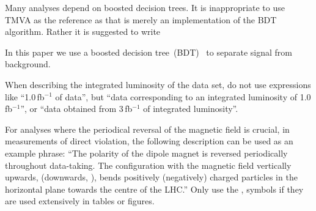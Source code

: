 Many analyses depend on boosted decision trees. It is inappropriate to
use TMVA as the reference as that is merely an implementation of the
BDT algorithm. Rather it is suggested to write

In this paper we use a boosted decision tree~(BDT)~\cite{Breiman,AdaBoost} to separate signal from
background.

When describing the integrated luminosity of the data set, do not use
expressions like ``1.0\,fb$^{-1}$ of data'', but \eg 
``data corresponding to an integrated luminosity of 1.0\,fb$^{-1}$'', 
or ``data obtained from 3\,fb$^{-1}$ of integrated luminosity''. 

For analyses where the periodical reversal of the magnetic field is crucial, 
\eg in measurements of direct \CP violation, the following description can be
used as an example phrase: 
``The polarity of the dipole magnet is reversed periodically throughout data-taking.
The configuration with the magnetic field vertically upwards, \MagUp (downwards, \MagDown), bends positively (negatively)
charged particles in the horizontal plane towards the centre of the LHC.''
Only use the \MagUp, \MagDown symbols if they are used extensively in tables or figures.
